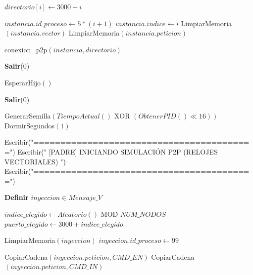 \begin{tcolorbox}[colback=white, colframe=azul_unam, title=Pseudocódigo: sinc\_vectoriales.c (P2P), breakable]
\begin{algorithmic}[1]
 

        \State $directorio[i] \gets 3000 + i$
    \EndFor

        
         
            
            \State $instancia.id\_proceso \gets 5 * (i + 1)$
            \State $instancia.indice \gets i$
            \State LimpiarMemoria$(instancia.vector)$ 
            \State LimpiarMemoria$(instancia.peticion)$
            
            \State conexion\_p2p$(instancia, directorio)$
            
            \State \textbf{Salir}(0)
            
        \EndIf
        
    \EndFor

        \State EsperarHijo$()$
    \EndFor

    \State \textbf{Salir}(0)

\Else {}

    \State GenerarSemilla$(TiempoActual() \text{ XOR } (ObtenerPID() \ll 16))$
    \State DormirSegundos$(1)$
    
    \State Escribir("=========================================")
    \State Escribir(" [PADRE] INICIANDO SIMULACIÓN P2P (RELOJES VECTORIALES) ")
    \State Escribir("=========================================")
    
    \State \textbf{Definir} $inyeccion \in Mensaje\_V$
    
        
        \State $indice\_elegido \gets Aleatorio() \text{ MOD } NUM\_NODOS$
        \State $puerto\_elegido \gets 3000 + indice\_elegido$
        
        \State LimpiarMemoria$(inyeccion)$ 
        \State $inyeccion.id\_proceso \gets 99$
        
            \State CopiarCadena$(inyeccion.peticion, CMD\_EN)$
        \Else
            \State CopiarCadena$(inyeccion.peticion, CMD\_IN)$
        \EndIf
        

\end{algorithmic}
\end{tcolorbox}
